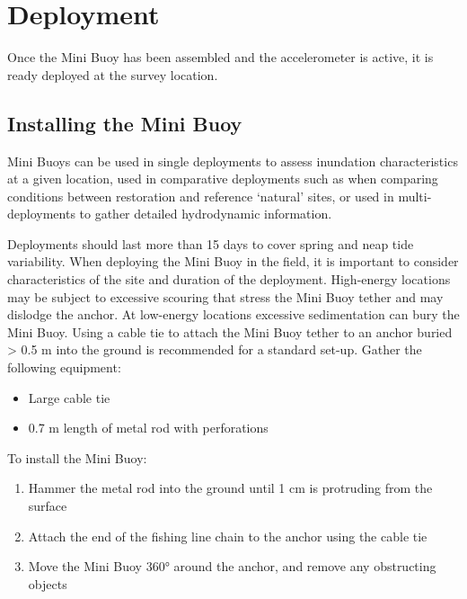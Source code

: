 \documentclass[
  letterpaper,
  DIV=11,
  numbers=noendperiod]{scrreprt}
\providecommand{\tightlist}{%
  \setlength{\itemsep}{0pt}\setlength{\parskip}{0pt}}\usepackage{longtable,booktabs,array}
\begin{document}

\hypertarget{deployment}{%
\chapter{Deployment}\label{deployment}}

Once the Mini Buoy has been assembled and the accelerometer is active,
it is ready deployed at the survey location.

\hypertarget{installing-the-mini-buoy}{%
\section{Installing the Mini Buoy}\label{installing-the-mini-buoy}}

Mini Buoys can be used in single deployments to assess inundation
characteristics at a given location, used in comparative deployments
such as when comparing conditions between restoration and reference
`natural' sites, or used in multi-deployments to gather detailed
hydrodynamic information.

Deployments should last more than 15 days to cover spring and neap tide
variability. When deploying the Mini Buoy in the field, it is important
to consider characteristics of the site and duration of the deployment.
High-energy locations may be subject to excessive scouring that stress
the Mini Buoy tether and may dislodge the anchor. At low-energy
locations excessive sedimentation can bury the Mini Buoy. Using a cable
tie to attach the Mini Buoy tether to an anchor buried \textgreater{}
0.5 m into the ground is recommended for a standard set-up. Gather the
following equipment:

\begin{itemize}
\tightlist
\item
  Large cable tie
\item
  0.7 m length of metal rod with perforations
\end{itemize}

To install the Mini Buoy:

\begin{enumerate}
\def\labelenumi{\arabic{enumi}.}
\tightlist
\item
  Hammer the metal rod into the ground until 1 cm is protruding from the
  surface
\item
  Attach the end of the fishing line chain to the anchor using the cable
  tie
\item
  Move the Mini Buoy 360° around the anchor, and remove any obstructing
  objects
\end{enumerate}
\end{document}
